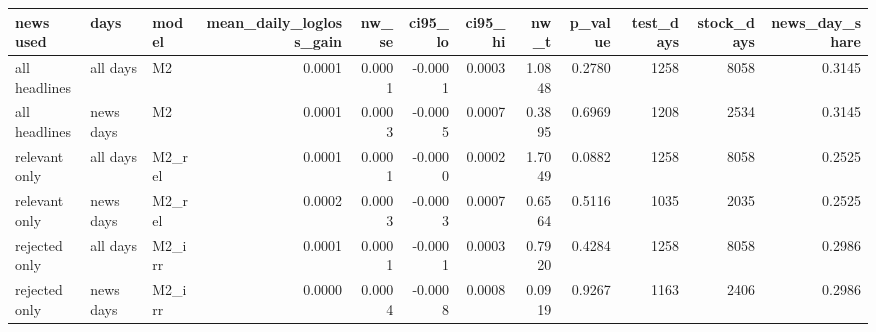 \begin{tabular}{lllrrrrrrrrr}
\toprule
news used & days & model & mean\_daily\_logloss\_gain & nw\_se & ci95\_lo & ci95\_hi & nw\_t & p\_value & test\_days & stock\_days & news\_day\_share \\
\midrule
all headlines & all days & M2 & 0.0001 & 0.0001 & -0.0001 & 0.0003 & 1.0848 & 0.2780 & 1258 & 8058 & 0.3145 \\
all headlines & news days & M2 & 0.0001 & 0.0003 & -0.0005 & 0.0007 & 0.3895 & 0.6969 & 1208 & 2534 & 0.3145 \\
relevant only & all days & M2\_rel & 0.0001 & 0.0001 & -0.0000 & 0.0002 & 1.7049 & 0.0882 & 1258 & 8058 & 0.2525 \\
relevant only & news days & M2\_rel & 0.0002 & 0.0003 & -0.0003 & 0.0007 & 0.6564 & 0.5116 & 1035 & 2035 & 0.2525 \\
rejected only & all days & M2\_irr & 0.0001 & 0.0001 & -0.0001 & 0.0003 & 0.7920 & 0.4284 & 1258 & 8058 & 0.2986 \\
rejected only & news days & M2\_irr & 0.0000 & 0.0004 & -0.0008 & 0.0008 & 0.0919 & 0.9267 & 1163 & 2406 & 0.2986 \\
\bottomrule
\end{tabular}
